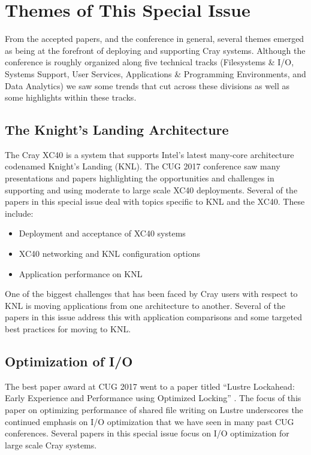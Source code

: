 \documentclass[AMA,LATO1COL,demo]{WileyNJD-v2}
\begin{document}
\section{Themes of This Special Issue}\label{sec:themes}

From the accepted papers, and the conference in general, several themes emerged as being
at the forefront of deploying and supporting Cray systems. Although the conference is
roughly organized along five technical tracks (Filesystems \& I/O, Systems Support, User
Services, Applications \& Programming Environments, and Data Analytics) we saw some trends
that cut across these divisions as well as some highlights within these tracks.

\subsection{The Knight's Landing Architecture}\label{sec:knl}

The Cray XC40 is a system that supports Intel's latest many-core architecture codenamed
Knight's Landing (KNL). The CUG 2017 conference saw many presentations and papers
highlighting the opportunities and challenges in supporting and using moderate to large
scale XC40 deployments. Several of the papers in this special issue deal with topics
specific to KNL and the XC40. These include: \begin{itemize} \item Deployment and
acceptance of XC40 systems \item XC40 networking and KNL configuration options \item
Application performance on KNL \end{itemize} One of the biggest challenges that has been
faced by Cray users with respect to KNL is moving applications from one architecture to
another. Several of the papers in this issue address this with application comparisons and
some targeted best practices for moving to KNL.

\subsection{Optimization of I/O}\label{sec:io}

The best paper award at CUG 2017 went to a paper titled ``Lustre Lockahead: Early
Experience and Performance using Optimized Locking'' \cite{Moore2017}. The focus of this
paper on optimizing performance of shared file writing on Lustre underscores the continued
emphasis on I/O optimization that we have seen in many past CUG conferences. Several
papers in this special issue focus on I/O optimization for large scale Cray systems.
\end{document}
